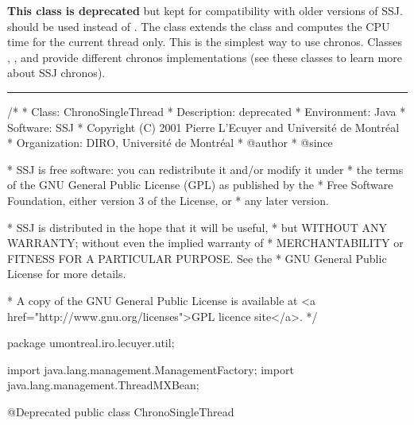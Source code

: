 
\textbf{This class is deprecated} but kept for
compatibility with older versions of SSJ.
 should be used instead of .
The  class extends the  
class and computes the CPU time for the current thread only.
This is the simplest way to use chronos. Classes ,
,  and 
 provide different chronos implementations
(see these classes to learn more about SSJ chronos).


\bigskip\hrule

\begin{code}
\begin{hide}
/*
 * Class:        ChronoSingleThread
 * Description:  deprecated
 * Environment:  Java
 * Software:     SSJ 
 * Copyright (C) 2001  Pierre L'Ecuyer and Université de Montréal
 * Organization: DIRO, Université de Montréal
 * @author       
 * @since

 * SSJ is free software: you can redistribute it and/or modify it under
 * the terms of the GNU General Public License (GPL) as published by the
 * Free Software Foundation, either version 3 of the License, or
 * any later version.

 * SSJ is distributed in the hope that it will be useful,
 * but WITHOUT ANY WARRANTY; without even the implied warranty of
 * MERCHANTABILITY or FITNESS FOR A PARTICULAR PURPOSE.  See the
 * GNU General Public License for more details.

 * A copy of the GNU General Public License is available at
   <a href="http://www.gnu.org/licenses">GPL licence site</a>.
 */
\end{hide}
package umontreal.iro.lecuyer.util;\begin{hide}

import java.lang.management.ManagementFactory;
import java.lang.management.ThreadMXBean;
\end{hide}


@Deprecated
public class ChronoSingleThread \begin{hide} extends AbstractChrono {

   private ThreadCPUTimeChrono chrono = new ThreadCPUTimeChrono();

   protected void getTime (long[] tab) {
         chrono.getTime(tab);
   }\end{hide}
\end{code}

